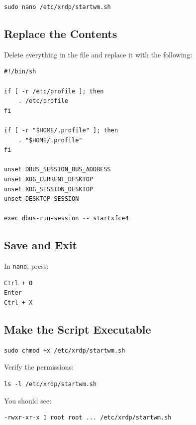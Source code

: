 \documentclass[a4paper,12pt]{article}
\newcommand{\code}[1]{\texttt{\small #1}}
\begin{document}
\begin{lstlisting}[style=bashstyle]
sudo nano /etc/xrdp/startwm.sh
\end{lstlisting}

\subsection{Replace the Contents}

Delete everything in the file and replace it with the following:

\begin{lstlisting}[style=shstyle]
#!/bin/sh

if [ -r /etc/profile ]; then
    . /etc/profile
fi

if [ -r "$HOME/.profile" ]; then
    . "$HOME/.profile"
fi

unset DBUS_SESSION_BUS_ADDRESS
unset XDG_CURRENT_DESKTOP
unset XDG_SESSION_DESKTOP
unset DESKTOP_SESSION

exec dbus-run-session -- startxfce4
\end{lstlisting}

\subsection{Save and Exit}

In \code{nano}, press:

\begin{lstlisting}[style=textstyle]
Ctrl + O
Enter
Ctrl + X
\end{lstlisting}

\subsection{Make the Script Executable}

\begin{lstlisting}[style=bashstyle]
sudo chmod +x /etc/xrdp/startwm.sh
\end{lstlisting}

Verify the permissions:

\begin{lstlisting}[style=bashstyle]
ls -l /etc/xrdp/startwm.sh
\end{lstlisting}

You should see:

\begin{lstlisting}[style=textstyle]
-rwxr-xr-x 1 root root ... /etc/xrdp/startwm.sh
\end{lstlisting}
\end{document}
